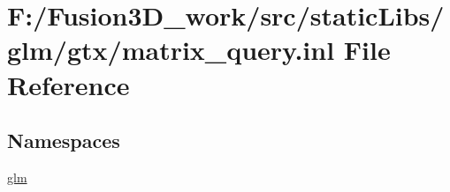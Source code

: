 \hypertarget{matrix__query_8inl}{}\section{F\+:/\+Fusion3\+D\+\_\+work/src/static\+Libs/glm/gtx/matrix\+\_\+query.inl File Reference}
\label{matrix__query_8inl}
\subsection*{Namespaces}
\begin{DoxyCompactItemize}
\item 
 \hyperlink{namespaceglm}{glm}
\end{DoxyCompactItemize}
